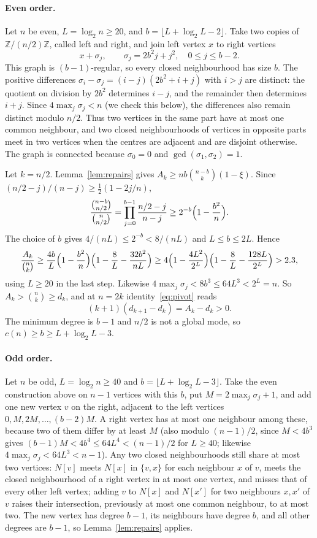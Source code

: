 \documentclass[11pt,a4paper]{article}
\theoremstyle{definition}
\theoremstyle{remark}
\begin{document}
\paragraph{Even order.}
Let $n$ be even, $L=\log_2 n\ge20$, and $b=\lfloor L+\log_2L-2\rfloor$. Take two copies of $\mathbb Z/(n/2)\mathbb Z$, called left and right, and join left vertex $x$ to right vertices
\[
x+\sigma_j,\qquad \sigma_j=2b^2j+j^2,\quad 0\le j\le b-2.
\]
This graph is $(b-1)$-regular, so every closed neighbourhood has size $b$. The positive differences $\sigma_i-\sigma_j=(i-j)(2b^2+i+j)$ with $i>j$ are distinct: the quotient on division by $2b^2$ determines $i-j$, and the remainder then determines $i+j$. Since $4\max_j\sigma_j<n$ (we check this below), the differences also remain distinct modulo $n/2$. Thus two vertices in the same part have at most one common neighbour, and two closed neighbourhoods of vertices in opposite parts meet in two vertices when the centres are adjacent and are disjoint otherwise. The graph is connected because $\sigma_0=0$ and $\gcd(\sigma_1,\sigma_2)=1$.

Let $k=n/2$. Lemma~\ref{lem:repairs} gives $A_k\ge nb\binom{n-b}{k}(1-\xi)$. Since $(n/2-j)/(n-j)\ge\tfrac12(1-2j/n)$,
\[
\frac{\binom{n-b}{n/2}}{\binom n{n/2}}=\prod_{j=0}^{b-1}\frac{n/2-j}{n-j}\ge2^{-b}\Bigl(1-\frac{b^2}n\Bigr).
\]
The choice of $b$ gives $4/(nL)\le2^{-b}<8/(nL)$ and $L\le b\le2L$. Hence
\[
\frac{A_k}{\binom nk}\ge\frac{4b}{L}\Bigl(1-\frac{b^2}n\Bigr)\Bigl(1-\frac8L-\frac{32b^2}{nL}\Bigr)
\ge4\Bigl(1-\frac{4L^2}{2^L}\Bigr)\Bigl(1-\frac8L-\frac{128L}{2^L}\Bigr)>2.3 ,
\]
using $L\ge20$ in the last step. Likewise $4\max_j\sigma_j<8b^3\le64L^3<2^L=n$. So $A_k>\binom nk\ge d_k$, and at $n=2k$ identity~\eqref{eq:pivot} reads
\[
(k+1)(d_{k+1}-d_k)=A_k-d_k>0 .
\]
The minimum degree is $b-1$ and $n/2$ is not a global mode, so $c(n)\ge b\ge L+\log_2L-3$.

\paragraph{Odd order.}
Let $n$ be odd, $L=\log_2n\ge40$ and $b=\lfloor L+\log_2L-3\rfloor$. Take the even construction above on $n-1$ vertices with this $b$, put $M=2\max_j\sigma_j+1$, and add one new vertex $v$ on the right, adjacent to the left vertices $0,M,2M,\dots,(b-2)M$. A right vertex has at most one neighbour among these, because two of them differ by at least $M$ (also modulo $(n-1)/2$, since $M<4b^3$ gives $(b-1)M<4b^4\le64L^4<(n-1)/2$ for $L\ge40$; likewise $4\max_j\sigma_j<64L^3<n-1$). Any two closed neighbourhoods still share at most two vertices: $N[v]$ meets $N[x]$ in $\{v,x\}$ for each neighbour $x$ of $v$, meets the closed neighbourhood of a right vertex in at most one vertex, and misses that of every other left vertex; adding $v$ to $N[x]$ and $N[x']$ for two neighbours $x,x'$ of $v$ raises their intersection, previously at most one common neighbour, to at most two. The new vertex has degree $b-1$, its neighbours have degree $b$, and all other degrees are $b-1$, so Lemma~\ref{lem:repairs} applies.
\end{document}
